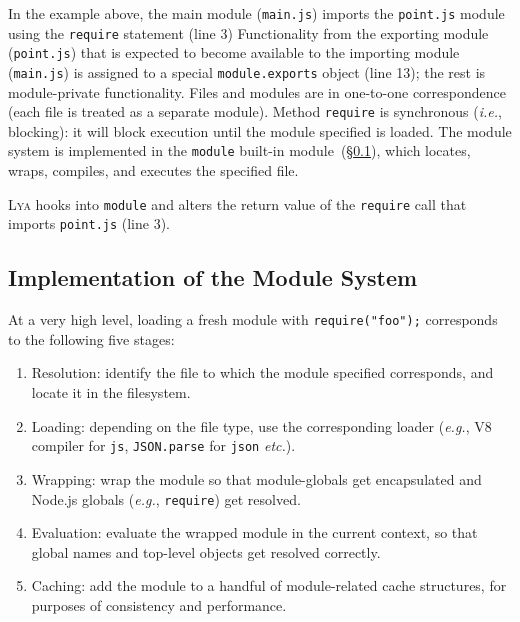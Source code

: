 \documentclass[letterpaper,twocolumn,10pt]{article}
\def\eg{{\em e.g.}, }
\def\ie{{\em i.e.}, }
\def\etc{{\em etc.}\xspace}
\newcommand{\ttt}[1]{\texttt{#1}}
\newcommand{\sx}[1]{(\S\ref{#1})}
\newcommand{\sys}{{\scshape Lya}\xspace}
\begin{document}
% 

In the example above, the main module (\ttt{main.js}) imports the \ttt{point.js} module using the \ttt{require} statement (line 3)
Functionality from the exporting module (\ttt{point.js}) that is expected to become available to the importing module (\ttt{main.js}) is assigned to a special \ttt{module.exports} object (line 13);
  the rest is module-private functionality.
Files and modules are in one-to-one correspondence (each file is treated as a separate module).
Method \ttt{require} is synchronous (\ie blocking):
  it will block execution until the module specified is loaded.
The module system is implemented in the \ttt{module} built-in module~\sx{c}, which locates, wraps, compiles, and executes the specified file.

\sys hooks into \ttt{module} and alters the return value of the \ttt{require} call that imports \ttt{point.js} (line 3).

\subsection{Implementation of the Module System}
\label{c}

At a very high level, loading a fresh module with \ttt{require("foo");} corresponds to the following five stages:

\begin{enumerate}
\item Resolution: identify the file to which the module specified corresponds, and locate it in the filesystem.
\item Loading: depending on the file type, use the corresponding loader (\eg V8 compiler for \ttt{js}, \ttt{JSON.parse} for \ttt{json} \etc).
\item Wrapping: wrap the module so that module-globals get encapsulated and Node.js globals (\eg \ttt{require}) get resolved.
\item Evaluation: evaluate the wrapped module in the current context, so that global names and top-level objects get resolved correctly.
\item Caching: add the module to a handful of module-related cache structures, for purposes of consistency and performance.
\end{enumerate}
\end{document}
